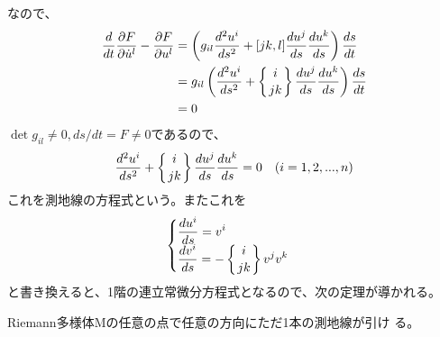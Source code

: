             なので、
            \begin{align*}
                \di{t}\pd[F]{\dot{u}^l}-\pd[F]{u^l}
                &= \lr{g_{il}\dd[u^i]{s}+[jk,l]\di[u^j]{s}\di[u^k]{s}}\di[s]{t}\\
                &= g_{il}\lr{\dd[u^i]{s}+\chr{i}{jk}\di[u^j]{s}\di[u^k]{s}}\di[s]{t}\\
                &= 0\\
            \end{align*}
            $\det g_{il}\neq 0,ds/dt=F\neq 0$であるので、
                \[\dd[u^i]{s}+\chr{i}{jk}\di[u^j]{s}\di[u^k]{s} = 0\quad (i=1,2,...,n)\]
            これを測地線の方程式という。またこれを
            \[\begin{cases}
                \displaystyle\di[u^i]{s} = v^i\\
                \displaystyle\di[v^i]{s} = -\chr{i}{jk}v^jv^k
            \end{cases}\]
            と書き換えると、1階の連立常微分方程式となるので、次の定理が導かれる。
            \begin{geodesic}
                Riemann多様体Mの任意の点で任意の方向にただ1本の測地線が引け
                る。
            \end{geodesic}

